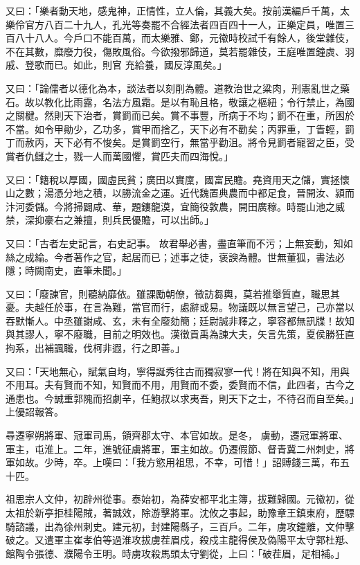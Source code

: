 \begin{pinyinscope}
 又曰：「樂者動天地，感鬼神，正情性，立人倫，其義大矣。按前漢編戶千萬，太樂伶官方八百二十九人，孔光等奏罷不合經法者四百四十一人，正樂定員，唯置三百八十八人。今戶口不能百萬，而太樂雅、鄭，元徽時校試千有餘人，後堂雜伎，不在其數，糜廢力役，傷敗風俗。今欲撥邪歸道，莫若罷雜伎，王庭唯置鐘虡、羽戚、登歌而已。如此，則官
 充給養，國反淳風矣。」



 又曰：「論儒者以德化為本，談法者以刻削為體。道教治世之粱肉，刑憲亂世之藥石。故以教化比雨露，名法方風霜。是以有恥且格，敬讓之樞紐；令行禁止，為國之關楗。然則天下治者，賞罰而已矣。賞不事豐，所病于不均；罰不在重，所困於不當。如令甲勛少，乙功多，賞甲而捨乙，天下必有不勸矣；丙罪重，丁眚輕，罰丁而赦丙，天下必有不悛矣。是賞罰空行，無當乎勸沮。將令見罰者寵習之臣，受賞者仇讎之士，戮一人而萬國懼，賞匹夫而四海悅。」



 又曰：「籍稅以厚國，國虛民貧；廣田以實廩，國富民贍。堯資用天之儲，實拯懷山之數；湯憑分地之積，以勝流金之運。近代魏置典農而中都足食，晉開汝、潁而汴河委儲。今將掃闢咸、華，題鏤龍漠，宜簡役敦農，開田廣稼。時罷山池之威禁，深抑豪右之兼擅，則兵民優贍，可以出師。」



 又曰：「古者左史記言，右史記事。
 故君舉必書，盡直筆而不污；上無妄動，知如絲之成綸。今者著作之官，起居而已；述事之徒，褒諛為體。世無董狐，書法必隱；時闕南史，直筆未聞。」



 又曰：「廢諫官，則聽納靡依。雖課勵朝僚，徵訪芻輿，莫若推舉質直，職思其憂。夫越任於事，在言為難，當官而行，處辭或易。物議既以無言望己，己亦當以吞默慚人。中丞雖謝咸、玄，未有全廢劾簡；廷尉誠非釋之，寧容都無訊牒！故知與其謬人，寧不廢職，目前之明效也。漢徵貢禹為諫大夫，矢言先策，夏侯勝狂直拘系，出補諷職，伐柯非遐，行之即善。」



 又曰：「天地無心，賦氣自均，寧得誕秀往古而獨寂寥一代！將在知與不知，用與不用耳。夫有賢而不知，知賢而不用，用賢而不委，委賢而不信，此四者，古今之通患也。今誠重郭隗而招劇辛，任鮑叔以求夷吾，則天下之士，不待召而自至矣。」上優詔報答。



 尋遷寧朔將軍、冠軍司馬，領齊郡太守、本官如故。是冬，
 虜動，遷冠軍將軍、軍主，屯淮上。二年，進號征虜將軍，軍主如故。仍遷假節、督青冀二州刺史，將軍如故。少時，卒。上嘆曰：「我方慾用祖思，不幸，可惜！」詔賻錢三萬，布五十匹。



 祖思宗人文仲，初辟州從事。泰始初，為薛安都平北主簿，拔難歸國。元徽初，從太祖於新亭拒桂陽賊，著誠效，除游擊將軍。沈攸之事起，助豫章王鎮東府，歷驃騎諮議，出為徐州刺史。建元初，封建陽縣子，三百戶。二年，虜攻鐘離，文仲擊破之。又遣軍主崔孝伯等過淮攻拔虜茬眉戍，殺戍主龍得侯及偽陽平太守郭杜羝、館陶令張德、濮陽令王明。時虜攻殺馬頭太守劉從，上曰：「破茬眉，足相補。」




\end{pinyinscope}

